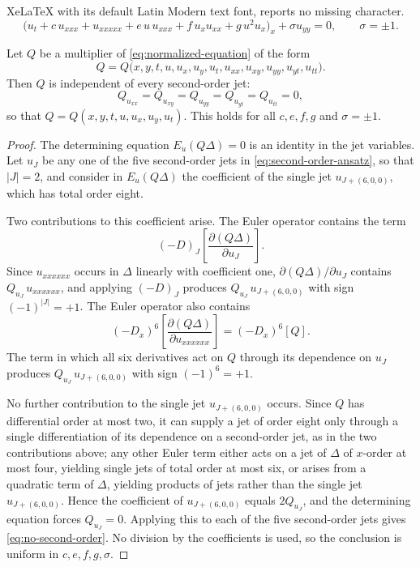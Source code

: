 \documentclass[10pt,a4paper]{amsart}
\begin{document}
XeLaTeX with its default Latin Modern text font, reports no missing character.
\begin{equation}
\bigl(u_t+c\,u_{xxx}+u_{xxxxx}
+e\,u\,u_{xxx}+f\,u_xu_{xx}+g\,u^2u_x\bigr)_x
+\sigma u_{yy}=0,
\qquad
\sigma=\pm1.
\label{eq:normalized-equation}
\end{equation}

\begin{theorem}
\label{thm:order-reduction}
Let $Q$ be a multiplier of \eqref{eq:normalized-equation} of the form
\begin{equation}
Q = Q\bigl(x,y,t,u,u_x,u_y,u_t,
u_{xx},u_{xy},u_{yy},u_{yt},u_{tt}\bigr).
\label{eq:second-order-ansatz}
\end{equation}
Then $Q$ is independent of every second-order jet:
\begin{equation}
Q_{u_{xx}} = Q_{u_{xy}} = Q_{u_{yy}}
= Q_{u_{yt}} = Q_{u_{tt}} = 0,
\label{eq:no-second-order}
\end{equation}
so that $Q = Q(x,y,t,u,u_x,u_y,u_t)$. This holds for all
$c,e,f,g$ and $\sigma=\pm1$.
\end{theorem}

\begin{proof}
The determining equation $E_u(Q\Delta)=0$ is an identity in the jet
variables. Let $u_J$ be any one of the five second-order jets in
\eqref{eq:second-order-ansatz}, so that $|J|=2$, and consider in
$E_u(Q\Delta)$ the coefficient of the single jet $u_{J+(6,0,0)}$,
which has total order eight.

Two contributions to this coefficient arise. The Euler operator
contains the term
\[
(-D)_J\left[
\frac{\partial(Q\Delta)}{\partial u_J}
\right].
\]
Since $u_{xxxxxx}$ occurs in $\Delta$ linearly with coefficient one,
$\partial(Q\Delta)/\partial u_J$ contains $Q_{u_J}\,u_{xxxxxx}$, and
applying $(-D)_J$ produces $Q_{u_J}\,u_{J+(6,0,0)}$ with sign
$(-1)^{|J|}=+1$. The Euler operator also contains
\[
(-D_x)^6\left[
\frac{\partial(Q\Delta)}{\partial u_{xxxxxx}}
\right]
=
(-D_x)^6[Q].
\] The term in which all six derivatives act on $Q$
through its dependence on $u_J$ produces $Q_{u_J}\,u_{J+(6,0,0)}$ with
sign $(-1)^6=+1$.

No further contribution to the single jet $u_{J+(6,0,0)}$ occurs.
Since $Q$ has differential order at most two, it can supply a jet of
order eight only through a single differentiation of its dependence on
a second-order jet, as in the two contributions above; any other
Euler term either acts on a jet of $\Delta$ of $x$-order at most four,
yielding single jets of total order at most six, or arises from a
quadratic term of $\Delta$, yielding products of jets rather than the
single jet $u_{J+(6,0,0)}$. Hence the coefficient of $u_{J+(6,0,0)}$
equals $2Q_{u_J}$, and the determining equation forces $Q_{u_J}=0$.
Applying this to each of the five second-order jets gives
\eqref{eq:no-second-order}. No division by the coefficients is used,
so the conclusion is uniform in $c,e,f,g,\sigma$.
\end{proof}
\end{document}
